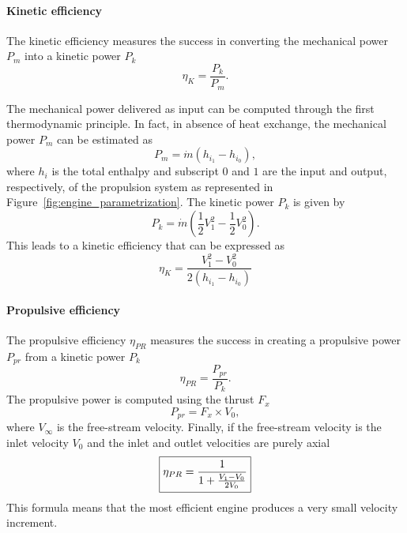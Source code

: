 \paragraph{Kinetic efficiency}
The kinetic efficiency measures the success in converting the mechanical
power $P_m$ into a kinetic power $P_k$
\begin{equation}
	\eta_K = \frac{P_k}{P_m}.
\end{equation}

The mechanical power delivered as input
can be computed through the first thermodynamic principle. In fact, in absence
of heat exchange, the mechanical power $P_m$ can be estimated as
\begin{equation}
	P_m = \dot{m} (h_{i_{1}} - h_{i_{0}}),
\end{equation}
where $h_i$ is the total enthalpy and subscript $0$ and $1$ are
the input and output, respectively, of the propulsion system as represented
in Figure~\ref{fig:engine_parametrization}.
The kinetic power $P_k$ is given by
\begin{equation}
	P_k = \dot{m} \left(\frac{1}{2} V^2_{1} -
	\frac{1}{2} V^2_{0} \right).
\end{equation}
This leads to a kinetic efficiency that can be expressed as
\begin{equation}
	\eta_{K} = \frac{V^2_{1} - V^2_{0}}{2 (h_{i_{1}} - h_{i_{0}})}
\end{equation}

\paragraph{Propulsive efficiency}
The propulsive efficiency $\eta_{PR}$ measures the success
in creating a propulsive power $P_{pr}$ from a
kinetic power $P_k$
\begin{equation}
	\eta_{PR} = \frac{P_{pr}}{P_k}.
\end{equation}
The propulsive power is computed using the thrust $F_x$
\begin{equation}
	P_{pr} = F_x \times V_{0},
\end{equation}
where $V_{\infty}$ is the free-stream velocity.
Finally, if the free-stream velocity is the inlet velocity $V_{0}$
and the inlet and outlet velocities are purely axial
\begin{equation}
	\fbox{$
	\eta_{PR} = \displaystyle \frac{1}{1 + \frac{V_{1} - V_{0}}{2 V_{0}}}
	$}
	\label{eq:cror_propulsive_efficiency}
\end{equation}
This formula means that the most efficient engine produces
a very small velocity increment.

